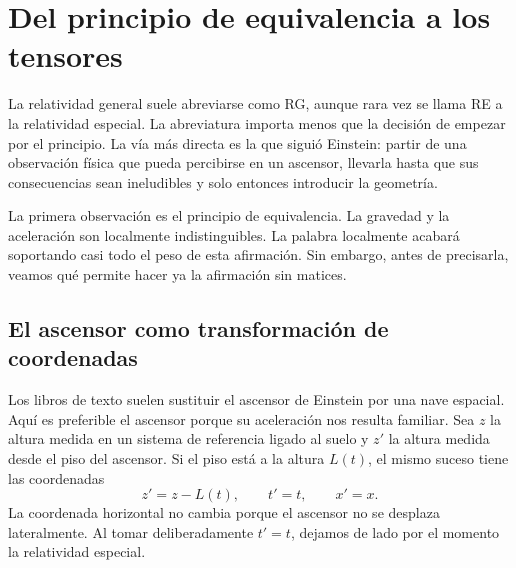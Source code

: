 \chapter{Del principio de equivalencia a los tensores}

La relatividad general suele abreviarse como RG, aunque rara vez se llama RE a la relatividad especial. La abreviatura importa menos que la decisión de empezar por el principio. La vía más directa es la que siguió Einstein: partir de una observación física que pueda percibirse en un ascensor, llevarla hasta que sus consecuencias sean ineludibles y solo entonces introducir la geometría.

La primera observación es el principio de equivalencia. La gravedad y la aceleración son localmente indistinguibles. La palabra localmente acabará soportando casi todo el peso de esta afirmación. Sin embargo, antes de precisarla, veamos qué permite hacer ya la afirmación sin matices.

\section{El ascensor como transformación de coordenadas}

Los libros de texto suelen sustituir el ascensor de Einstein por una nave espacial. Aquí es preferible el ascensor porque su aceleración nos resulta familiar. Sea \(z\) la altura medida en un sistema de referencia ligado al suelo y \(z'\) la altura medida desde el piso del ascensor. Si el piso está a la altura \(L(t)\), el mismo suceso tiene las coordenadas
\begin{equation}
 z'=z-L(t),\qquad t'=t,\qquad x'=x.
\label{eq:elevator-map}
\end{equation}
La coordenada horizontal no cambia porque el ascensor no se desplaza lateralmente. Al tomar deliberadamente \(t'=t\), dejamos de lado por el momento la relatividad especial.

\begin{classroomqa}
\end{classroomqa}

